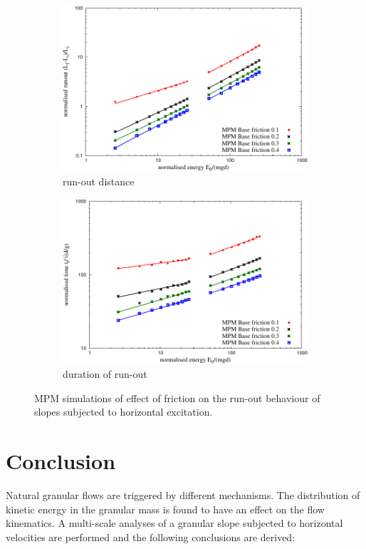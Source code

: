 \documentclass[3p,times,procedia,number]{elsarticle}
\begin{document}
\begin{figure}[tbhp]
  \centering
  \begin{subfigure}[b]{0.4\textwidth}
    \centering
    \includegraphics[width=\textwidth]{figs/runout_fric_slope}
    \caption{run-out distance}
    \label{fig:runout_fric_slope}
  \end{subfigure}
  \begin{subfigure}[b]{0.4\textwidth}
    \centering
    \includegraphics[width=\textwidth]{figs/time_fric_slope}
    \caption{duration of run-out}
    \label{fig:time_fric_slope}
  \end{subfigure}
  \caption{MPM simulations of effect of friction on the run-out behaviour of 
  slopes subjected to horizontal excitation.}
  \label{fig:fric_slope}
\end{figure}

\section{Conclusion}
Natural granular flows are triggered by different mechanisms. The distribution 
of kinetic energy in the granular mass is found to have an effect on the flow 
kinematics. A multi-scale analyses of a granular slope subjected to horizontal 
velocities are performed and the following conclusions are derived:
\end{document}
